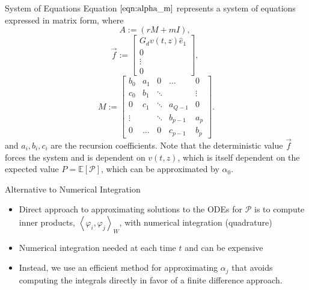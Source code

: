 \documentclass[final]{beamer} %
\renewcommand{\phi}{\varphi}
\newcommand{\field}[1]{\mathbb{#1}} %
\newcommand{\script}[1]{\mathcal{#1}} %
\begin{document}
\begin{frame}[t]
\begin{columns}[t]
\begin{column}{0.28\paperwidth}
\begin{block}{System of Equations }
Equation $\ref{eqn:alpha_m}$ represents a system of equations expressed in matrix form,
where
\[
A := (rM + mI),\;
\]
\[
\vec{f} := \left[\begin{array}{c}
G_d v(t,z) \hat{e}_1\\
0\\
\vdots\\
0
\end{array}\right],\;
\]
\[
M := \left[\begin{array}{ccccc}
b_0 & a_1 & 0 & \dots & 0 \\
c_0 & b_1 & \ddots &  & \vdots \\
0 & c_1 & \ddots & a_{Q-1} & 0 \\
\vdots &  & \ddots & b_{p-1} & a_p \\
0 & \dots & 0 & c_{p-1} & b_p
\end{array}\right].
\]
and $a_i, b_i, c_i$ are the recursion coefficients. Note that the deterministic
value $\vec{f}$ forces the system and is dependent on $v(t,z)$, which is itself
dependent on the expected value $P = \field{E}\left[\script{P}\right]$, which can
be approximated by $\alpha_0$.
\end{block}

\begin{block}{Alternative to Numerical Integration}
\begin{itemize}
\item
Direct approach to approximating solutions to the ODEs for $\script{P}$ 
is to compute inner products,
$\left<\phi_i,\phi_j\right>_W$, with numerical integration (quadrature)
\item
Numerical integration needed at each time $t$ and can be expensive
\item
Instead, we use an efficient method for approximating $\alpha_j$ that 
avoids computing the integrals directly in favor of a finite difference approach.
\end{itemize}
\end{block}
\end{column}


\end{columns}
\end{frame}
\end{document}

